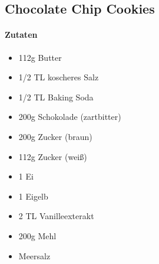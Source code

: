 \newpage
\subsection{Chocolate Chip Cookies}
\paragraph{Zutaten}
\begin{itemize}[noitemsep]
	\item 112g Butter 
	\item 1/2 TL koscheres Salz 
	\item 1/2 TL Baking Soda
	\item 200g Schokolade (zartbitter)
	\item 200g Zucker (braun)
	\item 112g Zucker (weiß)
	\item 1 Ei 
	\item 1 Eigelb 
	\item 2 TL Vanilleexterakt 
	\item 200g Mehl
	\item Meersalz
\end{itemize}
